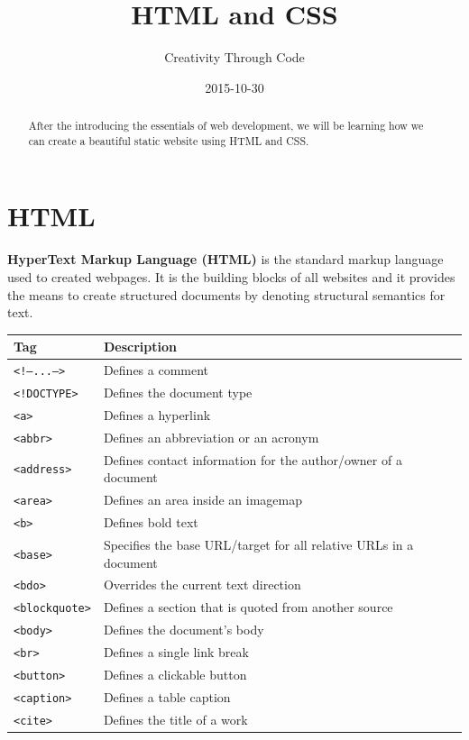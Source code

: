 \documentclass[11pt, letterpaper]{article}
\title{HTML and CSS}
\date{2015-10-30}
\author{Creativity Through Code}
\begin{document}
	\maketitle
	\newpage
	\begin{abstract}
		After the introducing the essentials of web development, we will be learning how we can create a beautiful static website using HTML and CSS.
	\end{abstract}
	\section{HTML}
		\textbf{HyperText Markup Language (HTML)} is the standard markup language used to created webpages. It is the building blocks of all websites and it provides the means to create structured documents by denoting structural semantics for text.
		\begin{longtable}{l l}
			\toprule
			Tag & Description \\\midrule
			\texttt{<!---...--->} & Defines a comment \\\midrule
			\texttt{<!DOCTYPE>} & Defines the document type \\\midrule
			\texttt{<a>} & Defines a hyperlink \\\midrule
			\texttt{<abbr>} & Defines an abbreviation or an acronym \\\midrule
			\texttt{<address>} & Defines contact information for the author/owner of a document \\\midrule
			\texttt{<area>} & Defines an area inside an image­map \\\midrule
			\texttt{<b>} & Defines bold text \\\midrule
			\texttt{<base>} & Specifies the base URL/target for all relative URLs in a document \\\midrule
			\texttt{<bdo>} & Overrides the current text direction \\\midrule
			\texttt{<blockquote>} & Defines a section that is quoted from another source \\\midrule
			\texttt{<body>} & Defines the document's body \\\midrule
			\texttt{<br>} & Defines a single link break \\\midrule
			\texttt{<button>} & Defines a clickable button \\\midrule
			\texttt{<caption>} & Defines a table caption \\\midrule
			\texttt{<cite>} & Defines the title of a work\\\midrule

\end{longtable}
\end{document}
